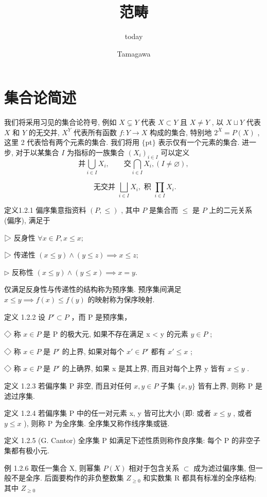 \documentclass[]{article}
\title{范畴}
\author{today}
\author{Tamagawa}
\begin{document}
	
\maketitle

\section{集合论简述}

我们将采用习见的集合论符号, 例如 $X \subsetneq Y$ 代表 $X \subset Y$ 且 $X \neq Y$ , 以 $X \sqcup Y$ 代表 $X$ 和 $Y$ 的无交并, $X^Y$ 代表所有函数 $f: Y \to X$ 构成的集合, 特别地 $2^X = P(X)$ , 这里 2 代表恰有两个元素的集合. 我们将用 $\{\mathrm{pt}\}$ 表示仅有一个元素的集合. 进一步, 对于以某集合 $I$ 为指标的一族集合 $(X_i)_{i \in I}$ 可以定义 $$
\text {并} \bigcup_ {i \in I} X _ {i}, \qquad \text {交} \bigcap_ {i \in I} X _ {i}, (I \neq \varnothing),
$$

$$
\text { 无交并 } \bigsqcup_ {i \in I} X _ {i}, \text { 积 } \prod_ {i \in I} X _ {i}.
$$

定义1.2.1 偏序集意指资料 $(P, \leq)$ , 其中 $P$ 是集合而 $\leq$ 是 $P$ 上的二元关系 (偏序), 满足于 

▷ 反身性 $\forall x \in P, x \leq x;$ 

▷ 传递性 $(x \leq y) \land (y \leq z) \implies x \leq z;$ 

$\triangleright$ 反称性 $(x\leq y)\land (y\leq x)\implies x = y.$ 

仅满足反身性与传递性的结构称为预序集. 预序集间满足 $x \leq y \implies f(x) \leq f(y)$ 的映射称为保序映射. 

定义 1.2.2 设 $P' \subset P$ ，而 P 是预序集， 

◇ 称 $x \in P$ 是 P 的极大元, 如果不存在满足 x < y 的元素 $y \in P$ ; 

◇ 称 $x \in P$ 是 $P'$ 的上界, 如果对每个 $x' \in P'$ 都有 $x' \leq x$ ; 

◇ 称 $x \in P$ 是 $P'$ 的上确界, 如果 x 是其上界, 而且对每个上界 y 皆有 $x \leq y$ . 

定义 1.2.3 若偏序集 P 非空, 而且对任何 $x, y \in P$ 子集 $\{x, y\}$ 皆有上界, 则称 P 是滤过序集. 

定义 1.2.4 若偏序集 P 中的任一对元素 x, y 皆可比大小 (即: 或者 $x \leq y$ , 或者 $y \leq x$ ), 则称 P 为全序集. 全序集又称作线序集或链. 

定义 1.2.5 (G. Cantor) 全序集 P 如满足下述性质则称作良序集: 每个 P 的非空子集都有极小元. 

例 1.2.6 取任一集合 X, 则幂集 $P(X)$ 相对于包含关系 $\subset$ 成为滤过偏序集, 但一般不是全序. 后面要构作的非负整数集 $Z_{\geq0}$ 和实数集 R 都具有标准的全序结构; 其中 $Z_{\geq0}$ 
\end{document}
